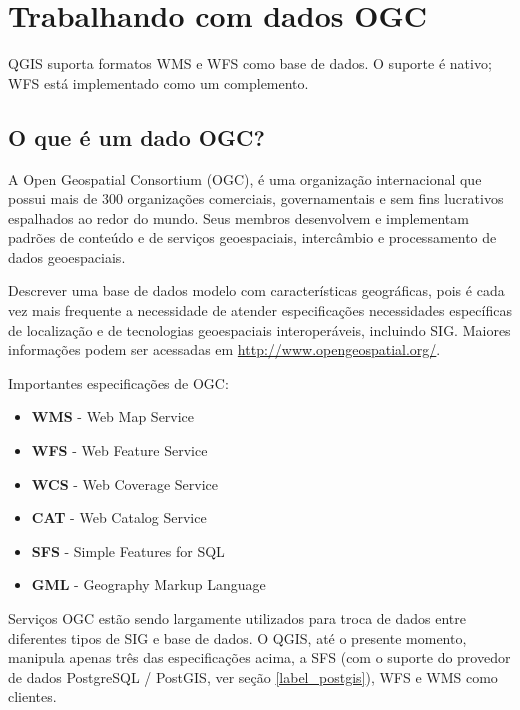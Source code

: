 \chapter{Trabalhando com dados OGC}\label{working_with_ogc}


QGIS suporta formatos WMS e WFS como base de dados. O suporte é nativo; WFS está implementado como um complemento.

\section{O que é um dado OGC?}

A Open Geospatial Consortium (OGC), é uma organização internacional que possui mais de 300 organizações comerciais, governamentais e sem fins lucrativos espalhados ao redor do mundo. Seus membros desenvolvem e implementam padrões de conteúdo e de serviços geoespaciais, intercâmbio e processamento de dados geoespaciais.

Descrever uma base de dados modelo com características geográficas, pois é cada vez mais frequente a necessidade de atender especificações necessidades específicas de localização e de tecnologias geoespaciais interoperáveis, incluindo SIG. Maiores informações podem ser acessadas em \url{http://www.opengeospatial.org/}.

Importantes especificações de OGC:

\begin{itemize}
\item \textbf{WMS} - Web Map Service
\item \textbf{WFS} - Web Feature Service
\item \textbf{WCS} - Web Coverage Service
\item \textbf{CAT} - Web Catalog Service
\item \textbf{SFS} - Simple Features for SQL
\item \textbf{GML} - Geography Markup Language
\end{itemize}

Serviços OGC estão sendo largamente utilizados para troca de dados entre diferentes tipos de SIG e base de dados. O QGIS, até o presente momento, manipula apenas três das especificações acima, a SFS (com o suporte do provedor de dados PostgreSQL / PostGIS, ver seção \ref{label_postgis}), WFS e WMS como clientes.

